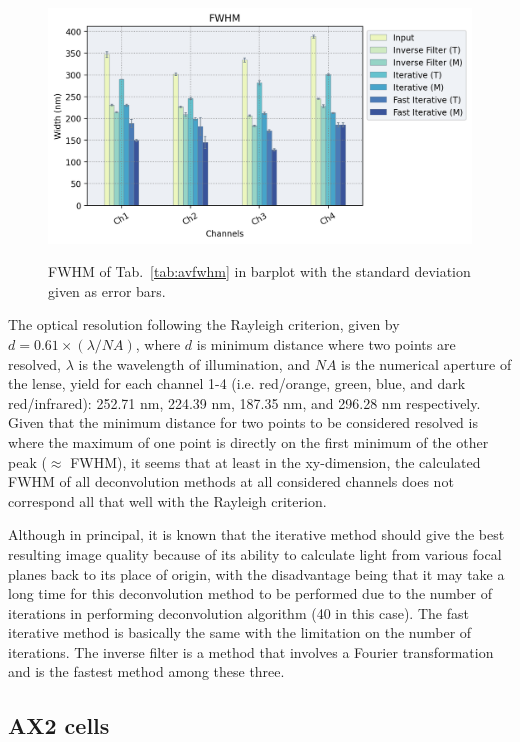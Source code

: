 \begin{figure}[h!]
\centering
\includegraphics[width=.8\columnwidth]{Exp_7_Deconvolution/Figures/av_tabnmerr7}\\
\caption{FWHM of Tab.~\ref{tab:avfwhm} in barplot with the standard deviation given as error bars.}
\label{fig:avfwhmbar}
\end{figure}

The optical resolution following the Rayleigh criterion, given by $d=0.61\times(\lambda/NA)$, where $d$ is minimum distance where two points are resolved, $\lambda$ is the wavelength of illumination, and $NA$ is the numerical aperture of the lense, yield for each channel 1-4 (i.e. red/orange, green, blue, and dark red/infrared): 252.71 nm, 224.39 nm, 187.35 nm, and 296.28 nm respectively. 
Given that the minimum distance for two points to be considered resolved is where the maximum of one point is directly on the first minimum of the other peak ($\approx$ FWHM), it seems that at least in the xy-dimension, the calculated FWHM of all deconvolution methods at all considered channels does not correspond all that well with the Rayleigh criterion.
 
Although in principal, it is known that the iterative method should give the best resulting image quality because of its ability to calculate light from various focal planes back to its place of origin, with the disadvantage being that it may take a long time for this deconvolution method to be performed due to the number of iterations in performing deconvolution algorithm (40 in this case). 
The fast iterative method is basically the same with the limitation on the number of iterations. 
The inverse filter is a method that involves a Fourier transformation and is the fastest method among these three.


\subsection{AX2 cells}

